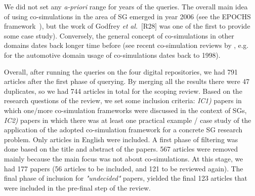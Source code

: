 \documentclass[1p]{elsarticle} %
\begin{document}




 
 
 
 We did not set any \textit{a-priori} range for years of the queries. The overall main idea of using co-simulations in the area of SG emerged in year 2006 (see the EPOCHS framework~\cite{ref:hopkinson2006epochs}), but the work of Godfrey \textit{et al.}~[R28] was one of the first to provide some case study). %
Conversely, the general concept of co-simulations in other domains dates back longer time before (see recent co-simulation reviews by \citet{ref:gomes2017co-sim-survey,ref:gomes2018co-sim-survey-acm}, e.g. for the automotive domain usage of co-simulations dates back to 1998). 

Overall, after running the queries on the four digital repositories, we had 791 articles after the first phase of querying. By merging all the results there were 47 duplicates, so we had 744 articles in total for the scoping review. Based on the research questions of the review, we set some inclusion criteria: \textit{IC1)} papers in which one/more co-simulation frameworks were discussed in the context of SGs, \textit{IC2)} papers in which there was at least one practical example / case study of the application of the adopted co-simulation framework for a concrete SG research problem. Only articles in English were included. A first phase of filtering was done based on the title and abstract of the papers. 567 articles were removed mainly because the main focus was not about co-simulations. At this stage, we had 177 papers (56 articles to be included, and 121 to be reviewed again). The final phase of inclusion for \textit{"undecided"} papers, yielded the final 123 articles that were included in the pre-final step of the review.
\end{document}
